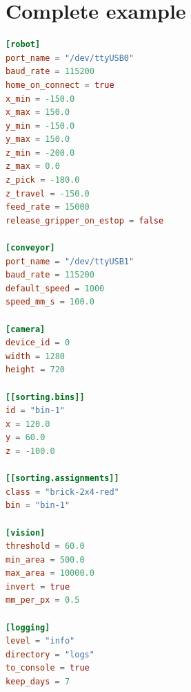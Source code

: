 \section{Complete example}
\begin{lstlisting}[language=TOML]
[robot]
port_name = "/dev/ttyUSB0"
baud_rate = 115200
home_on_connect = true
x_min = -150.0
x_max = 150.0
y_min = -150.0
y_max = 150.0
z_min = -200.0
z_max = 0.0
z_pick = -180.0
z_travel = -150.0
feed_rate = 15000
release_gripper_on_estop = false

[conveyor]
port_name = "/dev/ttyUSB1"
baud_rate = 115200
default_speed = 1000
speed_mm_s = 100.0

[camera]
device_id = 0
width = 1280
height = 720

[[sorting.bins]]
id = "bin-1"
x = 120.0
y = 60.0
z = -100.0

[[sorting.assignments]]
class = "brick-2x4-red"
bin = "bin-1"

[vision]
threshold = 60.0
min_area = 500.0
max_area = 10000.0
invert = true
mm_per_px = 0.5

[logging]
level = "info"
directory = "logs"
to_console = true
keep_days = 7
\end{lstlisting}
